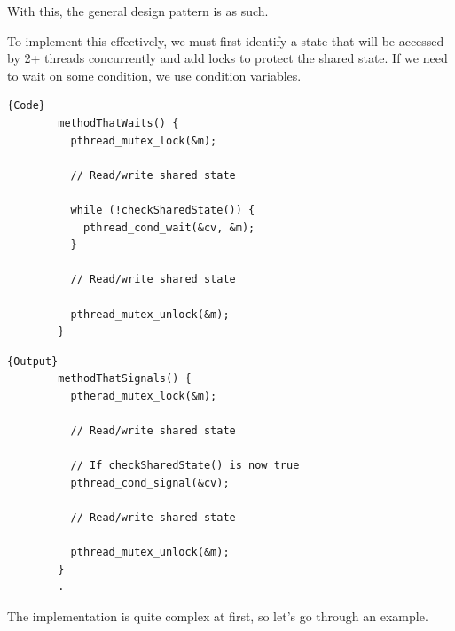 \documentclass{article}
\newcounter{theorem}[section]
\newcounter{example}[section]
\begin{document}
    With this, the general design pattern is as such. 

    \begin{theorem}
      \label{thm:condition-variable-design-pattern}
      To implement this effectively, we must first identify a state that will be accessed by 2+ threads concurrently and add locks to protect the shared state. If we need to wait on some condition, we use \hyperref[def:condition-variables]{condition variables}.  

      \noindent\begin{minipage}{.5\textwidth}
      \begin{lstlisting}[]{Code}
        methodThatWaits() {
          pthread_mutex_lock(&m); 

          // Read/write shared state 

          while (!checkSharedState()) {
            pthread_cond_wait(&cv, &m); 
          }

          // Read/write shared state 

          pthread_mutex_unlock(&m); 
        }
      \end{lstlisting}
      \end{minipage}
      \hfill
      \begin{minipage}{.49\textwidth}
      \begin{lstlisting}[]{Output}
        methodThatSignals() {
          ptherad_mutex_lock(&m); 

          // Read/write shared state 

          // If checkSharedState() is now true 
          pthread_cond_signal(&cv); 

          // Read/write shared state 

          pthread_mutex_unlock(&m); 
        }
        .
      \end{lstlisting}
      \end{minipage}
    \end{theorem}

    The implementation is quite complex at first, so let's go through an example. 
\end{document}
